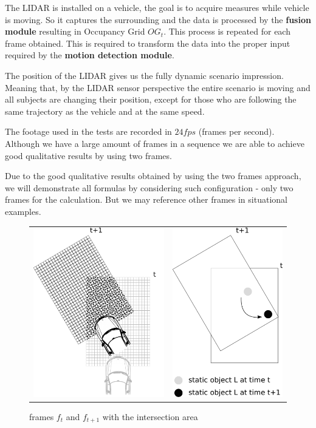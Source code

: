 The LIDAR is installed on a vehicle, the goal is to acquire measures while vehicle is moving. So it captures the surrounding and the data is processed by the \textbf{fusion module} resulting in Occupancy Grid $OG_t$. This process is repeated for each frame obtained. This is required to transform the data into the proper input required by the \textbf{motion detection module}.

The position of the LIDAR gives us the fully dynamic scenario impression. Meaning that, by the LIDAR sensor perspective the entire scenario is moving and all subjects are changing their position, except for those who are following the same trajectory as the vehicle and at the same speed. 

The footage used in the tests are recorded in $24fps$ (frames per second). Although we have a large amount of frames in a sequence we are able to achieve good qualitative results by using two frames. 

Due to the good qualitative results obtained by using the two frames approach, we will demonstrate all formulas by considering such configuration - only two frames for the calculation. But we may reference other frames in situational examples.


\begin{figure}[h]
   \centering
     \begin{tabular}{lr}
       \includegraphics[width=0.35\columnwidth]{img/fig:motion:algorithm:nonstatic:01}
       & \includegraphics[width=0.3\columnwidth]{img/fig:motion:algorithm:nonstatic:02}
     \end{tabular}
   \caption{frames $f_t$ and $f_{t+1}$ with the intersection area}
   \label{fig:motion:algorithm:nonstatic:01}
 \end{figure}

